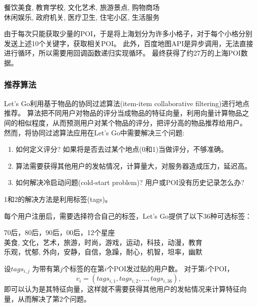 \documentclass[UTF8]{article}
\begin{document}
\begin{tcolorbox}[colback=white]
\begin{center}
餐饮美食, 教育学校, 文化艺术, 旅游景点, 购物商场\\
休闲娱乐, 政府机关, 医疗卫生, 住宅小区, 生活服务
\end{center}
\end{tcolorbox}

由于每次只能获取少量的POI，于是将上海划分为许多小格子，对于每个小格分别发送上述10个关键字，获取相关POI。
此外，百度地图API是异步调用，无法直接进行循环，所以需要用回调函数递归实现循环。
最终获得了约27万的上海POI数据。

\subsubsection{推荐算法}
Let's Go利用基于物品的协同过滤算法(item-item collaborative filtering)进行地点推荐。
算法把不同用户对物品的评分当成物品的特征向量，利用向量计算物品之间的相似程度，从而预测用户对某个物品的评分，把评分高的物品推荐给用户。
然而，将协同过滤算法应用在Let's Go中需要解决三个问题:
\begin{enumerate}
    \item 如何定义评分? 如果将是否去过某个地点(0和1)当做评分，不够准确。
    \item 算法需要获得其他用户的发帖情况，计算量大，对服务器造成压力，延迟高。
    \item 如何解决冷启动问题(cold-start problem)? 用户或POI没有历史记录怎么办? 
\end{enumerate}

1和2的解决方法是利用标签(tags)。

每个用户注册后，需要选择符合自己的标签，Let’s Go提供了以下36种可选标签：

\begin{tcolorbox}[colback=white]
\begin{center}
70后，80后，90后，00后，12个星座\\
美食, 文化，艺术，旅游，时尚，游戏，运动，科技，动漫，教育\\
乐观，忧郁, 外向，安静，自信，急躁，耐心，机智，坦率，幽默
\end{center}
\end{tcolorbox}

设$tags_{i,j}$ 为带有第$j$个标签的在第$i$个POI发过贴的用户数。
对于第$i$个POI，
\[v_i=(tags_{i,1},tags_{i,2},  …  ,tags_{i,36}),\]
即可以认为是其特征向量，这样就不需要获得其他用户的发帖情况来计算特征向量，从而解决了第2个问题。
\end{document}
